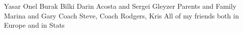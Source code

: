 Yasar Onel
Burak Bilki
Darin Acosta and Sergei Gleyzer
Parents and Family
Marina and Gary
Coach Steve, Coach Rodgers, Kris
All of my friends both in Europe and in Stats







